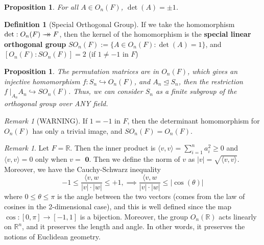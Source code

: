 \documentclass[12pt]{article}
\newtheorem{prop}[thm]{Proposition}
\theoremstyle{definition}
\newtheorem{defn}[thm]{Definition}
\theoremstyle{remark}
\newtheorem{rmk}[thm]{Remark}
\numberwithin{equation}{section}
\newcommand\R{\mathbb R}    %
\newcommand\B[1]{\textbf{ #1}}
\newcommand\nsub{\trianglelefteq}
\newcommand{\surrightarrow}{\rightarrow\mathrel{\mkern-14mu}\rightarrow}
\begin{document}
\vspace{15pt}

\begin{prop}
        For all $A \in O_n(F)$, $\det(A) = \pm 1$.
\end{prop}


\vspace{15pt}

\begin{defn}[Special Orthogonal Group]
        If we take the homomorphism $\det:O_n(F) \surrightarrow F$, then the kernel of the homomorphism is the \B{special linear orthogonal group} $SO_n(F) := \{A \in O_n(F): \det(A) = 1\}$, and $[O_n(F): SO_n(F)] = 2$ (if $1 \neq -1$ in $F$)
\end{defn}

\vspace{15pt}

\begin{prop}
        The permutation matrices are in $O_n(F)$, which gives an injective homomorphism $f:S_n \hookrightarrow O_n(F)$, and $A_n \nsub S_n$, then the restriction $f\;\Big\vert_{A_n}A_n\hookrightarrow SO_n(F)$. Thus, we can consider $S_n$ as a finite subgroup of the orthogonal group over ANY field.
\end{prop}
\begin{rmk}[WARNING]
        If $1 = -1$ in $F$, then the determinant homomorphism for $O_n(F)$ has only a trivial image, and $SO_n(F) = O_n(F)$.
\end{rmk}


\vspace{15pt}

\begin{rmk}
        Let $F = \R$. Then the inner product is $\langle v,v \rangle = \sum\limits_{i=1}^na_i^2 \geq 0$ and $\langle v,v\rangle = 0$ only when $v = \B{0}$. Then we define the norm of $v$ as $|v| = \sqrt{\langle v,v \rangle}$. Moreover, we have the Cauchy-Schwarz inequality \begin{equation}
                -1 \leq \frac{\langle v, w}{|v|\cdot |w|} \leq +1,\implies \frac{\langle v, w}{|v|\cdot |w|} \leq |\cos(\theta)|
        \end{equation}
        where $0 \leq \theta \leq \pi$ is the angle between the two vectors (comes from the law of cosines in the 2-dimensional case), and this is well defined since the map $\cos:[0,\pi]\rightarrow [-1,1]$ is a bijection. Moreover, the group $O_n(\R)$ acts linearly on $\R^n$, and it preserves the length and angle. In other words, it preserves the notions of Euclidean geometry.
\end{rmk}
\end{document}

